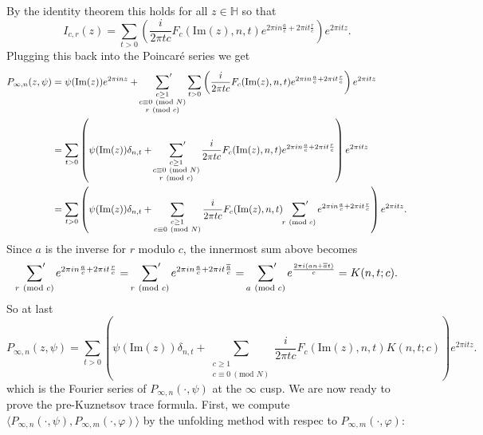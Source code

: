 \documentclass[12pt]{book}
\theoremstyle{definition}\newframedtheorem{method}{Method}
\newcommand{\psum}{\sideset{}{'}\sum}
\newcommand{\tmod}[1]{\ \left(\text{mod }#1\right)}
\renewcommand{\H}{\mathbb{H}}
\renewcommand{\d}{\delta}
\newcommand{\vphi}{\varphi}
\newcommand{\<}{\langle}
\renewcommand{\>}{\rangle}
\newcommand{\conj}{\overline}
\renewcommand{\Im}{\mathrm{Im}}
\begin{document}
      By the identity theorem this holds for all $z \in \H$ so that
      \[
        I_{c,r}(z) = \sum_{t > 0}\left(\frac{i}{2\pi tc}F_{c}(\Im(z),n,t)e^{2\pi in\frac{a}{c}+2\pi it\frac{r}{c}}\right)e^{2\pi itz}.
      \]
      Plugging this back into the Poincar\'e series we get
      \begin{align*}
        P_{\infty,n}(z,\psi) &= \psi(\Im(z))e^{2\pi inz}+\psum_{\substack{c \ge 1 \\ c \equiv 0 \tmod{N} \\ r \tmod{c}}}\sum_{t > 0}\left(\frac{i}{2\pi tc}F_{c}(\Im(z),n,t)e^{2\pi in\frac{a}{c}+2\pi it\frac{r}{c}}\right)e^{2\pi itz} \\
        &= \sum_{t > 0}\left(\psi(\Im(z))\d_{n,t}+\psum_{\substack{c \ge 1 \\ c \equiv 0 \tmod{N} \\ r \tmod{c}}}\frac{i}{2\pi tc}F_{c}(\Im(z),n,t)e^{2\pi in\frac{a}{c}+2\pi it\frac{r}{c}}\right)e^{2\pi itz} \\
        &= \sum_{t > 0}\left(\psi(\Im(z))\d_{n,t}+\sum_{\substack{c \ge 1 \\ c \equiv 0 \tmod{N}}}\frac{i}{2\pi tc}F_{c}(\Im(z),n,t)\psum_{r \tmod{c}}e^{2\pi in\frac{a}{c}+2\pi it\frac{r}{c}}\right)e^{2\pi itz}. \\
      \end{align*}
      Since $a$ is the inverse for $r$ modulo $c$, the innermost sum above becomes
      \[
        \psum_{r \tmod{c}}e^{2\pi in\frac{a}{c}+2\pi it\frac{r}{c}} = \psum_{r \tmod{c}}e^{2\pi in\frac{a}{c}+2\pi it\frac{\conj{a}}{c}} = \psum_{a \tmod{c}}e^{\frac{2\pi i(an+\conj{a}t)}{c}} = K(n,t;c).
      \]
      So at last
      \[
        P_{\infty,n}(z,\psi) = \sum_{t > 0}\left(\psi(\Im(z))\d_{n,t}+\sum_{\substack{c \ge 1 \\ c \equiv 0 \tmod{N}}}\frac{i}{2\pi tc}F_{c}(\Im(z),n,t)K(n,t;c)\right)e^{2\pi itz}.
      \]
      which is the Fourier series of $P_{\infty,n}(\cdot,\psi)$ at the $\infty$ cusp. We are now ready to prove the pre-Kuznetsov trace formula. First, we compute $\<P_{\infty,n}(\cdot,\psi),P_{\infty,m}(\cdot,\vphi)\>$ by the unfolding method with respec to $P_{\infty,m}(\cdot,\vphi)$:
\end{document}
